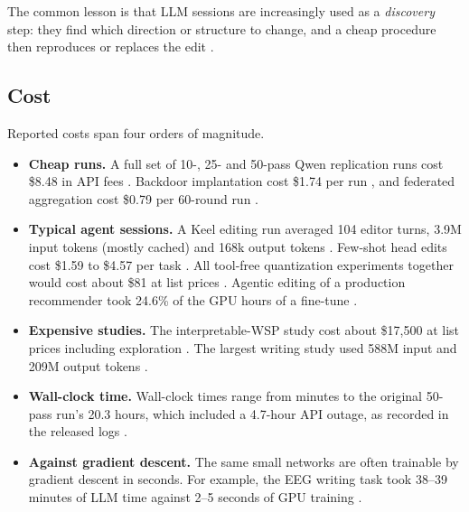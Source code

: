 The common lesson is that LLM sessions are increasingly used as a \emph{discovery} step: they find which direction or structure to change, and a cheap procedure then reproduces or replaces the edit \citep{ax2611_14210,ax2611_31233,ax2611_28105}.

\subsection{Cost}
\label{sec:cost}

Reported costs span four orders of magnitude.
\begin{itemize}[leftmargin=*,itemsep=2pt]
\item \textbf{Cheap runs.} A full set of 10-, 25- and 50-pass Qwen replication runs cost \$8.48 in API fees \citep{ax2611_20953}. Backdoor implantation cost \$1.74 per run \citep{ax2611_27920}, and federated aggregation cost \$0.79 per 60-round run \citep{ax2611_08383}.
\item \textbf{Typical agent sessions.} A Keel editing run averaged 104 editor turns, 3.9M input tokens (mostly cached) and 168k output tokens \citep{ax2611_25257}. Few-shot head edits cost \$1.59 to \$4.57 per task \citep{ax2611_28105}. All tool-free quantization experiments together would cost about \$81 at list prices \citep{ax2611_33031}. Agentic editing of a production recommender took 24.6\% of the GPU hours of a fine-tune \citep{ax2611_29613}.
\item \textbf{Expensive studies.} The interpretable-WSP study cost about \$17{,}500 at list prices including exploration \citep{ax2611_18114}. The largest writing study used 588M input and 209M output tokens \citep{ax2611_16981}.
\item \textbf{Wall-clock time.} Wall-clock times range from minutes to the original 50-pass run's 20.3 hours, which included a 4.7-hour API outage, as recorded in the released logs \citep{takehi2026sparks}.
\item \textbf{Against gradient descent.} The same small networks are often trainable by gradient descent in seconds. For example, the EEG writing task took 38--39 minutes of LLM time against 2--5 seconds of GPU training \citep{ax2611_13758}.
\end{itemize}

